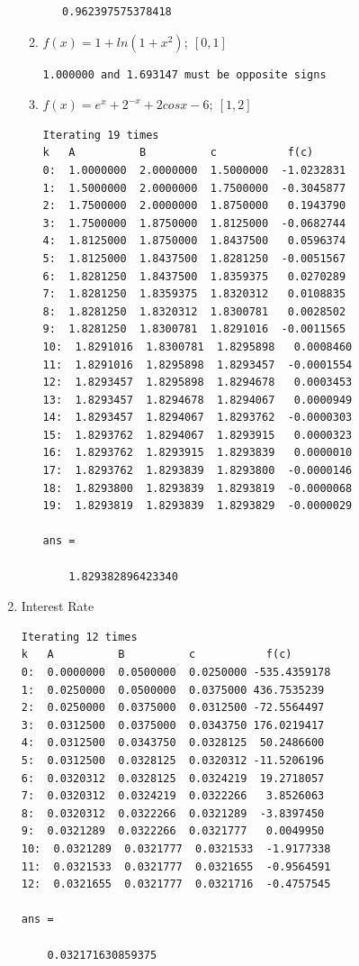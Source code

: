 \documentclass{article}
\begin{document}
\begin{enumerate}
\begin{enumerate}[label=(\alph*)]
\begin{lstlisting}
   0.962397575378418
            \end{lstlisting}
              \item \(f(x) = 1 + ln(1+x^2);\ [0, 1]\)
                    \begin{lstlisting}
1.000000 and 1.693147 must be opposite signs
        \end{lstlisting}
              \item \(f(x) = e^x + 2^{-x} + 2cosx - 6;\ [1, 2]\)
                    \begin{lstlisting}
Iterating 19 times
k   A          B          c           f(c)
0:  1.0000000  2.0000000  1.5000000  -1.0232831
1:  1.5000000  2.0000000  1.7500000  -0.3045877
2:  1.7500000  2.0000000  1.8750000   0.1943790
3:  1.7500000  1.8750000  1.8125000  -0.0682744
4:  1.8125000  1.8750000  1.8437500   0.0596374
5:  1.8125000  1.8437500  1.8281250  -0.0051567
6:  1.8281250  1.8437500  1.8359375   0.0270289
7:  1.8281250  1.8359375  1.8320312   0.0108835
8:  1.8281250  1.8320312  1.8300781   0.0028502
9:  1.8281250  1.8300781  1.8291016  -0.0011565
10:  1.8291016  1.8300781  1.8295898   0.0008460
11:  1.8291016  1.8295898  1.8293457  -0.0001554
12:  1.8293457  1.8295898  1.8294678   0.0003453
13:  1.8293457  1.8294678  1.8294067   0.0000949
14:  1.8293457  1.8294067  1.8293762  -0.0000303
15:  1.8293762  1.8294067  1.8293915   0.0000323
16:  1.8293762  1.8293915  1.8293839   0.0000010
17:  1.8293762  1.8293839  1.8293800  -0.0000146
18:  1.8293800  1.8293839  1.8293819  -0.0000068
19:  1.8293819  1.8293839  1.8293829  -0.0000029

ans =

    1.829382896423340
        \end{lstlisting}
          \end{enumerate}
    \item Interest Rate
          \begin{lstlisting}
Iterating 12 times
k   A          B          c           f(c)
0:  0.0000000  0.0500000  0.0250000 -535.4359178
1:  0.0250000  0.0500000  0.0375000 436.7535239
2:  0.0250000  0.0375000  0.0312500 -72.5564497
3:  0.0312500  0.0375000  0.0343750 176.0219417
4:  0.0312500  0.0343750  0.0328125  50.2486600
5:  0.0312500  0.0328125  0.0320312 -11.5206196
6:  0.0320312  0.0328125  0.0324219  19.2718057
7:  0.0320312  0.0324219  0.0322266   3.8526063
8:  0.0320312  0.0322266  0.0321289  -3.8397450
9:  0.0321289  0.0322266  0.0321777   0.0049950
10:  0.0321289  0.0321777  0.0321533  -1.9177338
11:  0.0321533  0.0321777  0.0321655  -0.9564591
12:  0.0321655  0.0321777  0.0321716  -0.4757545

ans =

    0.032171630859375
    \end{lstlisting}
\end{enumerate}
\end{document}
